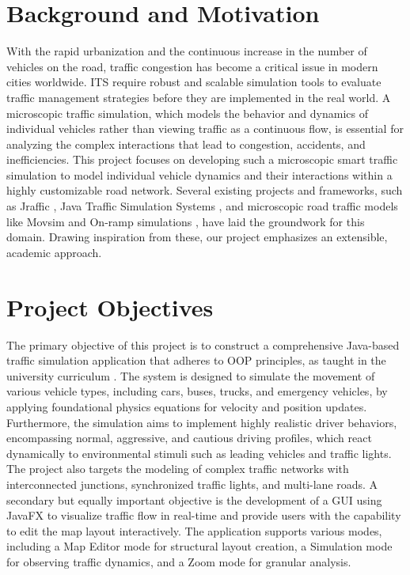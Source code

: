 \documentclass[../report_main.tex]{subfiles}
\begin{document}
\section{Background and Motivation}
With the rapid urbanization and the continuous increase in the number of vehicles on the road, traffic congestion has become a critical issue in modern cities worldwide. \gls{ITS} require robust and scalable simulation tools to evaluate traffic management strategies before they are implemented in the real world. A microscopic traffic simulation, which models the behavior and dynamics of individual vehicles rather than viewing traffic as a continuous flow, is essential for analyzing the complex interactions that lead to congestion, accidents, and inefficiencies. This project focuses on developing such a microscopic smart traffic simulation to model individual vehicle dynamics and their interactions within a highly customizable road network. Several existing projects and frameworks, such as Jraffic \cite{aminehabchi2023jraffic}, Java Traffic Simulation Systems \cite{zeeshier2023traffic}, and microscopic road traffic models like Movsim \cite{treiber2023movsim} and On-ramp simulations \cite{treiber2023onramp}, have laid the groundwork for this domain. Drawing inspiration from these, our project emphasizes an extensible, academic approach.

\section{Project Objectives}
The primary objective of this project is to construct a comprehensive Java-based traffic simulation application that adheres to \gls{OOP} principles, as taught in the university curriculum \cite{hustSlide}. The system is designed to simulate the movement of various vehicle types, including cars, buses, trucks, and emergency vehicles, by applying foundational physics equations for velocity and position updates. Furthermore, the simulation aims to implement highly realistic driver behaviors, encompassing normal, aggressive, and cautious driving profiles, which react dynamically to environmental stimuli such as leading vehicles and traffic lights. The project also targets the modeling of complex traffic networks with interconnected junctions, synchronized traffic lights, and multi-lane roads. A secondary but equally important objective is the development of a \gls{GUI} using JavaFX to visualize traffic flow in real-time and provide users with the capability to edit the map layout interactively. The application supports various modes, including a Map Editor mode for structural layout creation, a Simulation mode for observing traffic dynamics, and a Zoom mode for granular analysis.
\end{document}
